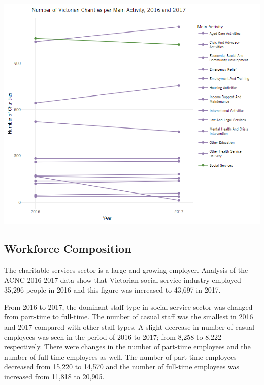 \documentclass[
  11pt,
]{article}
\let\origfigure\figure
\let\endorigfigure\endfigure
\renewenvironment{figure}[1][2] {
    \expandafter\origfigure\expandafter[H]
} {
    \endorigfigure
}
\begin{document}
\begin{figure}
\centering
\includegraphics{Fig3 Main Activity.png}
\caption{Count of Victorian Charities per Main Activity}
\end{figure}

\hypertarget{workforce-composition}{%
\subsection{Workforce Composition}\label{workforce-composition}}

The charitable services sector is a large and growing employer. Analysis of the ACNC 2016-2017 data show that Victorian social service industry employed 35,296 people in 2016 and this figure was increased to 43,697 in 2017.

From 2016 to 2017, the dominant staff type in social service sector was changed from part-time to full-time. The number of casual staff was the smallest in 2016 and 2017 compared with other staff types. A slight decrease in number of casual employees was seen in the period of 2016 to 2017; from 8,258 to 8,222 respectively. There were changes in the number of part-time employees and the number of full-time employees as well. The number of part-time employees decreased from 15,220 to 14,570 and the number of full-time employees was increased from 11,818 to 20,905.
\end{document}
